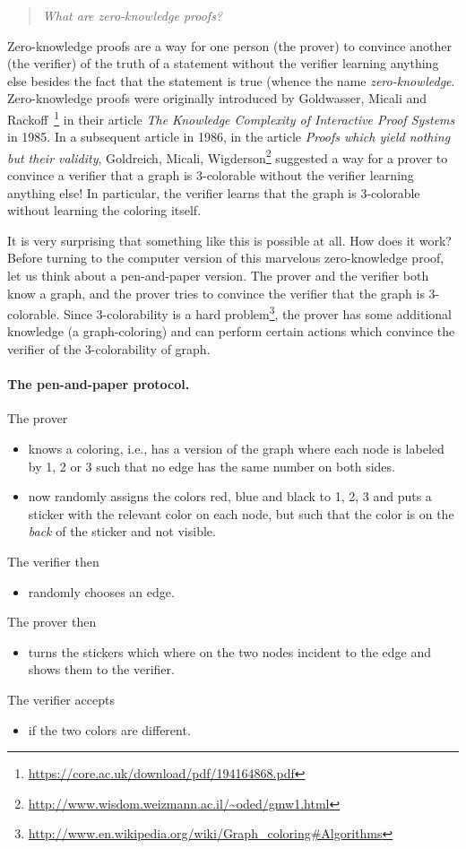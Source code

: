 \documentclass[a4paper,table,dvipsnames]{article}
\theoremstyle{definition}
\begin{document}
\begin{quote}
\emph{What are zero-knowledge proofs?}
\end{quote}


Zero-knowledge proofs are a way for one person (the prover) to convince another (the verifier)
of the truth of a statement without the verifier learning anything else besides the fact that
the statement is true (whence the name \emph{zero-knowledge}. Zero-knowledge proofs were originally introduced by Goldwasser, Micali
and Rackoff~\footnote{\url{https://core.ac.uk/download/pdf/194164868.pdf}} in their article \emph{The Knowledge Complexity of Interactive Proof Systems} in
1985. In a subsequent article in 1986, in the article \emph{Proofs which yield 
nothing but their validity}, Goldreich, Micali, Wigderson\footnote{\url{http://www.wisdom.weizmann.ac.il/~oded/gmw1.html}} suggested a way for a prover to 
convince a verifier that a graph is 3-colorable without the verifier learning anything else! In
particular, the verifier learns that the graph is 3-colorable without learning the coloring itself.

It is very surprising that something like this is possible at all. How does it work? Before turning
to the computer version of this marvelous zero-knowledge proof, let us think about a pen-and-paper version. 
The prover and the verifier both know a graph, and the prover tries to convince the verifier that the
graph is 3-colorable. Since 3-colorability is a hard problem\footnote{\url{http://www.en.wikipedia.org/wiki/Graph_coloring\#Algorithms}},
the prover has some additional knowledge (a graph-coloring) and can perform certain actions which convince the
verifier of the 3-colorability of graph.

\paragraph{The pen-and-paper protocol.} The prover
\begin{itemize}
\item[(1)] knows a coloring, i.e., has a version of the graph where each node is labeled by 1, 2 or 3
such that no edge has the same number on both sides.
\item[(2)] now randomly assigns the colors red, blue and black to 1, 2, 3 and puts a sticker with the
relevant color on each node, but such that the color is on the \emph{back} of the sticker and not
visible.
\end{itemize}
The verifier then
\begin{itemize}
\item[(3)] randomly chooses an edge.
\end{itemize}
The prover then 
\begin{itemize}
\item[(4)] turns the stickers which where on the two nodes incident to the edge and shows them to the verifier.
\end{itemize}
The verifier accepts
\begin{itemize}
\item[(5)] if the two colors are different.
\end{itemize}
\end{document}
